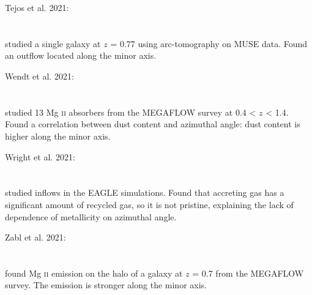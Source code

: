 \hline

Tejos et al. 2021: \\
\citet{2021MNRAS.507..663T} \\
\citep{2021MNRAS.507..663T} \\
studied a single galaxy at $z$ = 0.77 using arc-tomography on MUSE data. Found
an outflow located along the minor axis. \\

\hline

Wendt et al. 2021: \\
\citet{2021MNRAS.502.3733W} \\
\citep{2021MNRAS.502.3733W} \\
studied 13 Mg \textsc{ii} absorbers from the MEGAFLOW survey at 0.4 < $z$ < 1.4.
Found a correlation between dust content and azimuthal angle: dust content is
higher along the minor axis. \\

\hline

Wright et al. 2021: \\
\citet{2021MNRAS.504.5702W} \\
\citep{2021MNRAS.504.5702W} \\
studied inflows in the EAGLE simulations. Found that accreting gas has a
significant amount of recycled gas, so it is not pristine, explaining the lack
of dependence of metallicity on azimuthal angle. \\

\hline

Zabl et al. 2021: \\
\citet{2021MNRAS.507.4294Z} \\
\citep{2021MNRAS.507.4294Z} \\
found Mg \textsc{ii} emission on the halo of a galaxy at $z$ = 0.7 from the
MEGAFLOW survey. The emission is stronger along the minor axis. \\
